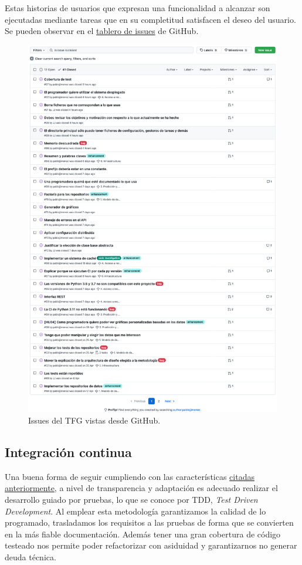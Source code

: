 Estas historias de usuarios que expresan una funcionalidad a alcanzar son ejecutadas
mediante tareas que en su completitud satisfacen el deseo del usuario. Se pueden observar en
el \href{https://github.com/pablojjimenez/TFG/issues}{tablero de issues} de GitHub.

\FloatBarrier
\begin{figure}[h]
	\centering
	\includegraphics[width=\textwidth]{doc/logos/imgs/issues.png}
	\caption{ Issues del TFG vistas desde GitHub. }
    \label{fig:issues-HU}
\end{figure}
\FloatBarrier


\subsection{Integración continua}
\label{sec:ci}
Una buena forma de seguir cumpliendo con las características \hyperref[sec:meto]{citadas
anteriormente}, a nivel de transparencia y adaptación es adecuado realizar el
desarrollo guiado por pruebas, lo que se conoce por TDD, \textit{Test Driven Development}.
Al emplear esta metodología garantizamos la calidad de lo programado, trasladamos los
requisitos a las pruebas de forma que se convierten en la más fiable documentación. Además
tener una gran cobertura de código testeado nos permite poder refactorizar con asiduidad y
garantizarnos no generar deuda técnica. 

